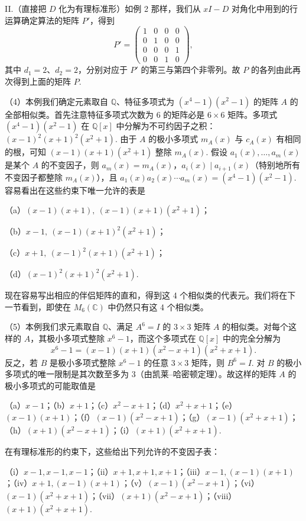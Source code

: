 \begin{example}
\noindent II.（直接把 \(D\) 化为有理标准形）如例 2 那样，我们从 \(xI-D\) 对角化中用到的行运算确定算法的矩阵 \(P'\)，得到
\[
P' = \begin{pmatrix} 1 & 0 & 0 & 0 \\ 0 & 1 & 0 & 0 \\ 0 & 0 & 0 & 1 \\ 0 & 0 & 1 & 0 \end{pmatrix},
\]
其中 \(d_1 = 2\)、\(d_2 = 2\)，分别对应于 \(P'\) 的第三与第四个非零列。故 \(P\) 的各列由此再次得到上面的矩阵 \(P\).

（4）本例我们确定元素取自 \(\mathbb{Q}\)、特征多项式为 \((x^4-1)(x^2-1)\) 的矩阵 \(A\) 的全部相似类。首先注意特征多项式次数为 6 的矩阵必是 \(6 \times 6\) 矩阵。多项式 \((x^4-1)(x^2-1)\) 在 \(\mathbb{Q}[x]\) 中分解为不可约因子之积：\((x-1)^2(x+1)^2(x^2+1)\). 由于 \(A\) 的极小多项式 \(m_A(x)\) 与 \(c_A(x)\) 有相同的根，可知 \((x-1)(x+1)(x^2+1)\) 整除 \(m_A(x)\). 假设 \(a_1(x), \ldots, a_m(x)\) 是某个 \(A\) 的不变因子，则 \(a_m(x) = m_A(x)\)，\(a_i(x) \mid a_{i+1}(x)\)（特别地所有不变因子都整除 \(m_A(x)\)），且 \(a_1(x)a_2(x)\cdots a_m(x) = (x^4-1)(x^2-1)\). 容易看出在这些约束下唯一允许的表是

（a）\((x-1)(x+1),\ (x-1)(x+1)(x^2+1)\)；

（b）\(x-1,\ (x-1)(x+1)^2(x^2+1)\)；

（c）\(x+1,\ (x-1)^2(x+1)(x^2+1)\)；

（d）\((x-1)^2(x+1)^2(x^2+1)\).

现在容易写出相应的伴侣矩阵的直和，得到这 4 个相似类的代表元。我们将在下一节看到，即使在 \(M_6(\mathbb{C})\) 中仍然只有这 4 个相似类。

（5）本例我们求元素取自 \(\mathbb{Q}\)、满足 \(A^6 = I\) 的 \(3 \times 3\) 矩阵 \(A\) 的相似类。对每个这样的 \(A\)，其极小多项式整除 \(x^6-1\)，而这个多项式在 \(\mathbb{Q}[x]\) 中的完全分解为
\[
x^6-1 = (x-1)(x+1)(x^2-x+1)(x^2+x+1).
\]
反之，若 \(B\) 是极小多项式整除 \(x^6-1\) 的任意 \(3 \times 3\) 矩阵，则 \(B^6 = I\). 对 \(B\) 的极小多项式的唯一限制是其次数至多为 3（由凯莱--哈密顿定理）。故这样的矩阵 \(A\) 的极小多项式的可能取值是

（a）\(x-1\)；（b）\(x+1\)；（c）\(x^2-x+1\)；（d）\(x^2+x+1\)；（e）\((x-1)(x+1)\)；（f）\((x-1)(x^2-x+1)\)；（g）\((x-1)(x^2+x+1)\)；（h）\((x+1)(x^2-x+1)\)；（i）\((x+1)(x^2+x+1)\).

在有理标准形的约束下，这些给出下列允许的不变因子表：

（i）\(x-1, x-1, x-1\)；（ii）\(x+1, x+1, x+1\)；（iii）\(x-1, (x-1)(x+1)\)；（iv）\(x+1, (x-1)(x+1)\)；（v）\((x-1)(x^2-x+1)\)；（vi）\((x-1)(x^2+x+1)\)；（vii）\((x+1)(x^2-x+1)\)；（viii）\((x+1)(x^2+x+1)\).


\end{example}
